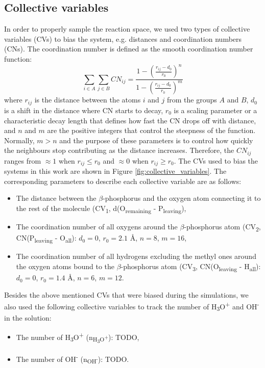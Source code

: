 \subsection{Collective variables}
In order to properly sample the reaction space, we used two types of collective variables (CVs) to bias the system, e.g. distances and coordination numbers (CNs). The coordination number is defined as the smooth coordination number function:
\begin{equation}
    \sum_{i \in A} \sum_{j \in B} CN_{ij} = \frac{1 - \left( \frac{r_{ij} - d_0}{r_0} \right)^n}{1 - \left( \frac{r_{ij} - d_0}{r_0} \right)^m}
    \label{eq:coordination_number}
\end{equation}
where $r_{ij}$ is the distance between the atoms $i$ and $j$ from the groups $A$ and $B$, $d_0$ is a shift in the distance where CN starts to decay, $r_0$ is a scaling parameter or a characteristic decay length that defines how fast the CN drops off with distance, and $n$ and $m$ are the positive integers that control the steepness of the function. Normally, $m > n$ and the purpose of these parameters is to control how quickly the neighbours stop contributing as the distance increases. Therefore, the $CN_{ij}$ ranges from $\approx1$ when $r_{ij} \le r_0$ and $\approx0$ when $r_{ij} \ge r_0$. The CVs used to bias the systems in this work are shown in Figure \ref{fig:collective_variables}. The corresponding parameters to describe each collective variable are as follows:

\begin{itemize}
    \item The distance between the $\beta$-phosphorus and the oxygen atom connecting it to the rest of the molecule (CV\textsubscript{1}, d(O\textsubscript{remaining} - P\textsubscript{leaving}),
    \item The coordination number of all oxygens around the $\beta$-phosphorus atom (CV\textsubscript{2}, CN(P\textsubscript{leaving} - O\textsubscript{all}): $d_0 = 0$, $r_0 = 2.1$ \AA, $n = 8$, $m = 16$,
    \item The coordination number of all hydrogens excluding the methyl ones around the oxygen atoms bound to the $\beta$-phosphorus atom (CV\textsubscript{3}, CN(O\textsubscript{leaving} - H\textsubscript{all}): $d_0 = 0$, $r_0 = 1.4$ \AA, $n = 6$, $m = 12$.
\end{itemize}

Besides the above mentioned CVs that were biased during the simulations, we also used the following collective variables to track the number of H\textsubscript{3}O\textsuperscript{+} and OH\textsuperscript{-} in the solution:
\begin{itemize}
    \item The number of H\textsubscript{3}O\textsuperscript{+} (n\textsubscript{H\textsubscript{3}O\textsuperscript{+}}): TODO,
    \item The number of OH\textsuperscript{-} (n\textsubscript{OH\textsuperscript{-}}): TODO.
\end{itemize}

